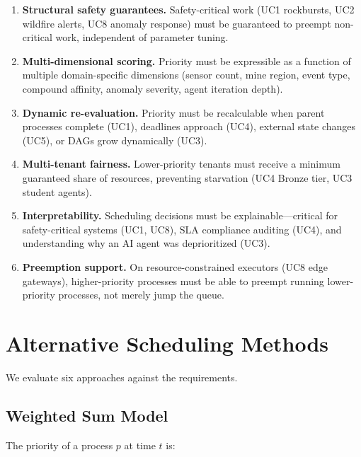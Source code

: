 \documentclass[conference]{IEEEtran}
\begin{document}
\begin{enumerate}
    \item[\textbf{R1}] \textbf{Structural safety guarantees.} Safety-critical work (UC1 rockbursts, UC2 wildfire alerts, UC8 anomaly response) must be guaranteed to preempt non-critical work, independent of parameter tuning.

    \item[\textbf{R2}] \textbf{Multi-dimensional scoring.} Priority must be expressible as a function of multiple domain-specific dimensions (sensor count, mine region, event type, compound affinity, anomaly severity, agent iteration depth).

    \item[\textbf{R3}] \textbf{Dynamic re-evaluation.} Priority must be recalculable when parent processes complete (UC1), deadlines approach (UC4), external state changes (UC5), or DAGs grow dynamically (UC3).

    \item[\textbf{R4}] \textbf{Multi-tenant fairness.} Lower-priority tenants must receive a minimum guaranteed share of resources, preventing starvation (UC4 Bronze tier, UC3 student agents).

    \item[\textbf{R5}] \textbf{Interpretability.} Scheduling decisions must be explainable---critical for safety-critical systems (UC1, UC8), SLA compliance auditing (UC4), and understanding why an AI agent was deprioritized (UC3).

    \item[\textbf{R6}] \textbf{Preemption support.} On resource-constrained executors (UC8 edge gateways), higher-priority processes must be able to preempt running lower-priority processes, not merely jump the queue.
\end{enumerate}

\section{Alternative Scheduling Methods}
\label{sec:methods}

We evaluate six approaches against the requirements.

\subsection{Weighted Sum Model}

The priority of a process $p$ at time $t$ is:
\end{document}

